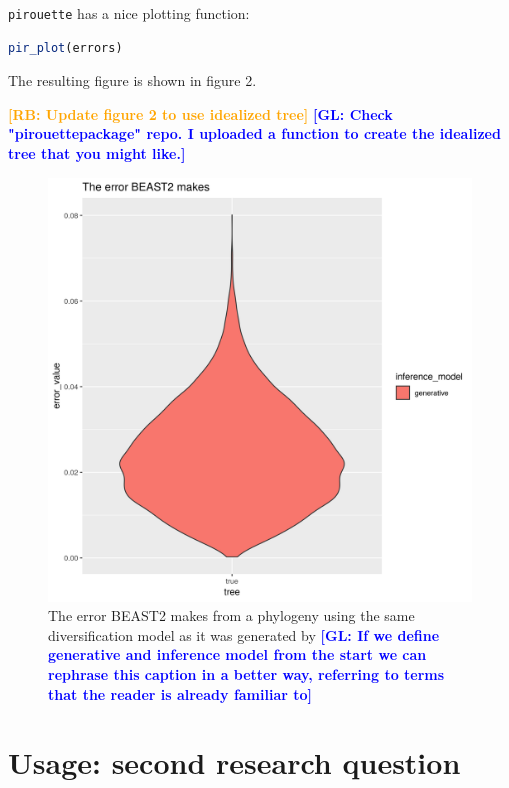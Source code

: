\documentclass{article}
\newcommand{\giovanni}[1]{\textcolor{blue}{\textbf{[GL: #1]}}}
\newcommand{\richel}[1]{\textcolor{orange}{\textbf{[RB: #1]}}}
\begin{document}
\verb;pirouette; has a nice plotting function:

\begin{lstlisting}[language=R, floatplacement=H, frame=single]
pir_plot(errors)
\end{lstlisting}

The resulting figure is shown in figure 2.

\richel{Update figure 2 to use idealized tree}
\giovanni{Check "pirouettepackage" repo. I uploaded a function to create the idealized tree that you might like.}

\begin{figure}[h]
  \includegraphics[width=\textwidth]{figure_2.png}
  \caption{
    The error BEAST2 makes from a phylogeny using the same 
    diversification model as it was generated by
    \giovanni{If we define generative and inference model from the start we can rephrase this caption in a better way, referring to terms that the reader is already familiar to}
  }
\end{figure}

\section{Usage: second research question}
\end{document}
